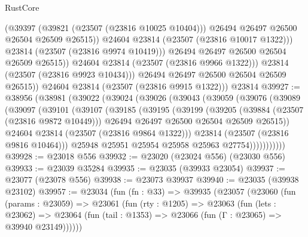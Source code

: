 \begin{lexlean}{RustCore}
\begin{coremodule}
                        (@39397
                          (@39821 (@23507 (@23816 @10025 @10404)))
                          @26494
                          @26497
                          @26500
                          @26504
                          @26509
                          @26515))
                      @24604
                      @23814
                      (@23507 (@23816 @10017 @1322)))
                    @23814
                    (@23507 (@23816 @9974 @10419)))
                  @26494
                  @26497
                  @26500
                  @26504
                  @26509
                  @26515))
              @24604
              @23814
              (@23507 (@23816 @9966 @1322)))
            @23814
            (@23507 (@23816 @9923 @10434)))
          @26494
          @26497
          @26500
          @26504
          @26509
          @26515))
      @24604
      @23814
      (@23507 (@23816 @9915 @1322)))
    @23814
@39927 := @38956
    (@38981
      (@39022
        (@39024
          (@39026
            (@39043
              (@39059
                (@39076
                  (@39089
                    (@39097
                      (@39101
                        (@39107
                          (@39185
                            (@39195
                              (@39199
                                (@39205
                                  (@39884 (@23507 (@23816 @9872 @10449)))
                                  @26494
                                  @26497
                                  @26500
                                  @26504
                                  @26509
                                  @26515))
                              @24604
                              @23814
                              (@23507 (@23816 @9864 @1322)))
                            @23814
                            (@23507 (@23816 @9816 @10464)))
                          @25948
                          @25951
                          @25954
                          @25958
                          @25963
                          @27754)))))))))))
@39928 := @23018 @556
@39932 := @23020 (@23024 @556) (@23030 @556)
@39933 := @23039 @35284
@39935 := @23035 (@39933 @23054)
@39937 := @23077 (@23078 @556)
@39938 := @23073 @39937
@39940 := @23035 (@39938 @23102)
@39957 := @23034
    (fun (fn : @33) =>
    @39935
      (@23057
        (@23060
          (fun (params : @23059) =>
          @23061
            (fun (rty : @1205) =>
            @23063
              (fun (lets : @23062) =>
              @23064 (fun (tail : @1353) => @23066 (fun (Γ : @23065) => @39940 @23149))))))

\end{coremodule}
\end{lexlean}

